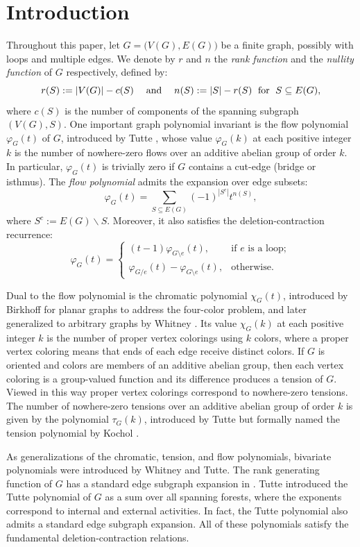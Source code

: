 \documentclass[12pt]{article}%
\numberwithin{equation}{section}
\def\For{\mbox{\rm ~for~}}
\begin{document}
\section{Introduction}\label{Sec-1}
Throughout this paper, let $G =\big (V(G), E(G)\big)$ be a finite graph,  possibly with loops and multiple edges. We denote by $r$ and $n$ the {\em rank function } and  the {\em nullity function} of  $G$ respectively, defined by: 
\[
r(S):=|V(G)|-c(S)\;\quad{\rm and}\;\quad n(S):=|S|-r(S) \;\For\; S\subseteq E(G),
\]
where $c(S)$ is the number of  components of the spanning subgraph $(V(G),S)$. One important graph polynomial invariant is the flow polynomial $\varphi_G(t)$ of $G$, introduced by Tutte \cite{Tutte1954}, whose value $\varphi_G(k)$ at each positive integer $k$ is the number of nowhere-zero flows over an additive abelian group of order $k$. In particular, $\varphi_G(t)$ is trivially zero if $G$ contains a cut-edge (bridge or isthmus). The {\em flow polynomial} admits the expansion over edge subsets:
\[
\varphi_G(t)=\sum_{S\subseteq E(G)}(-1)^{|S^c|}t^{n(S)},
\]
where $S^c:=E(G)\smallsetminus S$. Moreover, it also satisfies the deletion-contraction recurrence:
\[
\varphi_G(t)=
\begin{cases}
(t-1)\varphi_{G\setminus e}(t),&\mbox{if } e \mbox{ is a loop};\\
\varphi_{G/e}(t)-\varphi_{G\setminus e}(t),&\mbox{otherwise}.
\end{cases}
\]


Dual to the flow polynomial is the chromatic polynomial $\chi_G(t)$, introduced by Birkhoff \cite{Birkhoff1912} for planar graphs to address the four-color problem, and later generalized to arbitrary graphs by Whitney \cite{Whitney1932,Whitney1932-1}. Its value $\chi_G(k)$ at each positive integer $k$ is the number of proper vertex colorings using $k$ colors, where a proper vertex coloring means that ends of each edge receive distinct colors. If $G$ is oriented and colors are members of an additive abelian group, then each vertex coloring is a group-valued function and its difference produces a tension of $G$. Viewed in this way proper vertex colorings correspond to nowhere-zero tensions. The number of nowhere-zero tensions over an additive abelian group of order $k$ is given by the polynomial $\tau_G(k)$, introduced by Tutte \cite{Tutte1954} but formally named the tension polynomial by Kochol \cite{Kochol2002}. 

As generalizations of the chromatic, tension, and flow polynomials, bivariate polynomials were introduced by Whitney and Tutte. The rank generating function of $G$ has a standard edge subgraph expansion in \cite{Whitney1932-1}. Tutte \cite{Tutte1954,Tutte1967} introduced the Tutte polynomial of $G$ as a sum over all spanning forests, where the exponents correspond to internal and external activities. In fact, the Tutte polynomial also admits a standard edge subgraph expansion. All of these polynomials satisfy the fundamental deletion-contraction relations.
\end{document}
